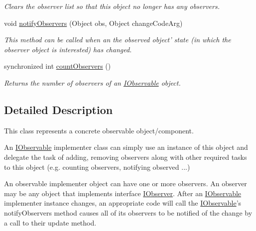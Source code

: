 \begin{DoxyCompactItemize}
\begin{DoxyCompactList}\small\item\em Clears the observer list so that this object no longer has any observers. \end{DoxyCompactList}\item 
void \hyperlink{classuk_1_1ac_1_1dmu_1_1iesd_1_1cascade_1_1util_1_1_observable_component_a58665d8608f3c82887f5c4478ec957f8}{notify\-Observers} (Object obs, Object change\-Code\-Arg)
\begin{DoxyCompactList}\small\item\em This method can be called when an the observed object' state (in which the observer object is interested) has changed. \end{DoxyCompactList}\item 
synchronized int \hyperlink{classuk_1_1ac_1_1dmu_1_1iesd_1_1cascade_1_1util_1_1_observable_component_a3bb10b28f32a2ff32640031b7167e306}{count\-Observers} ()
\begin{DoxyCompactList}\small\item\em Returns the number of observers of an {\ttfamily \hyperlink{interfaceuk_1_1ac_1_1dmu_1_1iesd_1_1cascade_1_1util_1_1_i_observable}{I\-Observable}} object. \end{DoxyCompactList}\end{DoxyCompactItemize}


\subsection{Detailed Description}
This class represents a concrete observable object/component. 

An \hyperlink{interfaceuk_1_1ac_1_1dmu_1_1iesd_1_1cascade_1_1util_1_1_i_observable}{I\-Observable} implementer class can simply use an instance of this object and delegate the task of adding, removing observers along with other required tasks to this object (e.\-g. counting observers, notifying observed ...) 

An observable implementer object can have one or more observers. An observer may be any object that implements interface {\ttfamily \hyperlink{interfaceuk_1_1ac_1_1dmu_1_1iesd_1_1cascade_1_1util_1_1_i_observer}{I\-Observer}}. After an \hyperlink{interfaceuk_1_1ac_1_1dmu_1_1iesd_1_1cascade_1_1util_1_1_i_observable}{I\-Observable} implementer instance changes, an appropriate code will call the {\ttfamily \hyperlink{interfaceuk_1_1ac_1_1dmu_1_1iesd_1_1cascade_1_1util_1_1_i_observable}{I\-Observable}}'s {\ttfamily notify\-Observers} method causes all of its observers to be notified of the change by a call to their {\ttfamily update} method. 

